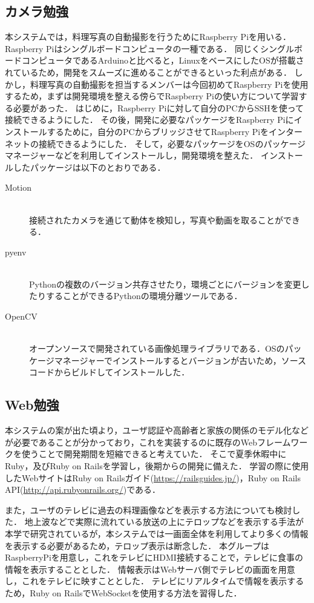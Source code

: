 \documentclass[../report]{subfiles}
\begin{document}
\subsection{カメラ勉強}
本システムでは，料理写真の自動撮影を行うためにRaspberry Piを用いる．
Raspberry Piはシングルボードコンピュータの一種である．
同じくシングルボードコンピュータであるArduinoと比べると，LinuxをベースにしたOSが搭載されているため，開発をスムーズに進めることができるといった利点がある．
しかし，料理写真の自動撮影を担当するメンバーは今回初めてRaspberry Piを使用するため，まずは開発環境を整える傍らでRaspberry Piの使い方について学習する必要があった．
はじめに，Raspberry Piに対して自分のPCからSSHを使って接続できるようにした．
その後，開発に必要なパッケージをRaspberry Piにインストールするために，自分のPCからブリッジさせてRaspberry Piをインターネットの接続できるようにした．
そして，必要なパッケージをOSのパッケージマネージャーなどを利用してインストールし，開発環境を整えた．
インストールしたパッケージは以下のとおりである．
\begin{description}
    \item[Motion] \mbox{}\\
    接続されたカメラを通じて動体を検知し，写真や動画を取ることができる．
    \item[pyenv] \mbox{}\\
    Pythonの複数のバージョン共存させたり，環境ごとにバージョンを変更したりすることができるPythonの環境分離ツールである．
    \item[OpenCV] \mbox{}\\
    オープンソースで開発されている画像処理ライブラリである．OSのパッケージマネージャーでインストールするとバージョンが古いため，ソースコードからビルドしてインストールした．
\end{description}


\subsection{Web勉強}
本システムの案が出た頃より，ユーザ認証や高齢者と家族の関係のモデル化などが必要であることが分かっており，これを実装するのに既存のWebフレームワークを使うことで開発期間を短縮できると考えていた．
そこで夏季休暇中にRuby，及びRuby on Railsを学習し，後期からの開発に備えた．
学習の際に使用したWebサイトはRuby on Railsガイド(\url{https://railsguides.jp/})，Ruby on Rails API(\url{http://api.rubyonrails.org/})である．

また，ユーザのテレビに過去の料理画像などを表示する方法についても検討した．
地上波などで実際に流れている放送の上にテロップなどを表示する手法が本学で研究されているが，本システムでは一画面全体を利用してより多くの情報を表示する必要があるため，テロップ表示は断念した．
本グループはRaspberryPiを用意し，これをテレビにHDMI接続することで，テレビに食事の情報を表示することとした．
情報表示はWebサーバ側でテレビの画面を用意し，これをテレビに映すこととした．
テレビにリアルタイムで情報を表示するため，Ruby on RailsでWebSocketを使用する方法を習得した．
\end{document}

